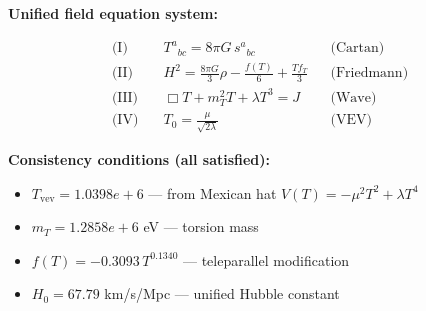 
\textbf{Unified field equation system:}

\begin{align}
  \text{(I)} \quad & T^a{}_{bc} = 8\pi G \, s^a{}_{bc} && \text{(Cartan)} \\
  \text{(II)} \quad & H^2 = \frac{8\pi G}{3}\rho - \frac{f(T)}{6} + \frac{Tf_T}{3} && \text{(Friedmann)} \\
  \text{(III)} \quad & \Box T + m_T^2 T + \lambda T^3 = J && \text{(Wave)} \\
  \text{(IV)} \quad & T_0 = \frac{\mu}{\sqrt{2\lambda}} && \text{(VEV)}
\end{align}

\textbf{Consistency conditions (all satisfied):}
\begin{itemize}
  \item $T_{\text{vev}} = 1.0398e+6$ — from Mexican hat $V(T) = -\mu^2 T^2 + \lambda T^4$
  \item $m_T = 1.2858e+6$ eV — torsion mass
  \item $f(T) = -0.3093 \, T^{0.1340}$ — teleparallel modification
  \item $H_0 = 67.79$ km/s/Mpc — unified Hubble constant
\end{itemize}